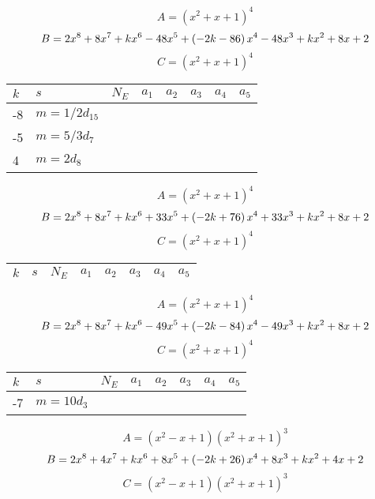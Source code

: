 \documentclass{amsart}
\begin{document}
$$A=(x^2
 + x
 + 1)^{4}$$
$$B=2\*x^8
 + 8\*x^7
 + k\*x^6
 - 48\*x^5
 + \left(-2\*k
 - 86\right) \*x^4
 - 48\*x^3
 + k\*x^2
 + 8\*x
 + 2$$
$$C=(x^2
 + x
 + 1)^{4}$$
\begin{longtable}{|l|l|l|lllll|}
\hline
$k$ & $s$ & $N_E$ & $a_1$ & $a_2$ & $a_3$ & $a_4$ & $a_5$\\
\hline
-8&$m=1/2d_{15}$&&\multicolumn{5}{c|}{}\\
-5&$m=5/3d_{7}$&&\multicolumn{5}{c|}{}\\
4&$m=2d_{8}$&&\multicolumn{5}{c|}{}\\
\hline
\end{longtable}
$$A=(x^2
 + x
 + 1)^{4}$$
$$B=2\*x^8
 + 8\*x^7
 + k\*x^6
 + 33\*x^5
 + \left(-2\*k
 + 76\right) \*x^4
 + 33\*x^3
 + k\*x^2
 + 8\*x
 + 2$$
$$C=(x^2
 + x
 + 1)^{4}$$
\begin{longtable}{|l|l|l|lllll|}
\hline
$k$ & $s$ & $N_E$ & $a_1$ & $a_2$ & $a_3$ & $a_4$ & $a_5$\\
\hline
\hline
\end{longtable}
$$A=(x^2
 + x
 + 1)^{4}$$
$$B=2\*x^8
 + 8\*x^7
 + k\*x^6
 - 49\*x^5
 + \left(-2\*k
 - 84\right) \*x^4
 - 49\*x^3
 + k\*x^2
 + 8\*x
 + 2$$
$$C=(x^2
 + x
 + 1)^{4}$$
\begin{longtable}{|l|l|l|lllll|}
\hline
$k$ & $s$ & $N_E$ & $a_1$ & $a_2$ & $a_3$ & $a_4$ & $a_5$\\
\hline
-7&$m=10d_{3}$&&\multicolumn{5}{c|}{}\\
\hline
\end{longtable}
$$A=(x^2
 - x
 + 1)(x^2
 + x
 + 1)^{3}$$
$$B=2\*x^8
 + 4\*x^7
 + k\*x^6
 + 8\*x^5
 + \left(-2\*k
 + 26\right) \*x^4
 + 8\*x^3
 + k\*x^2
 + 4\*x
 + 2$$
$$C=(x^2
 - x
 + 1)(x^2
 + x
 + 1)^{3}$$
\end{document}
